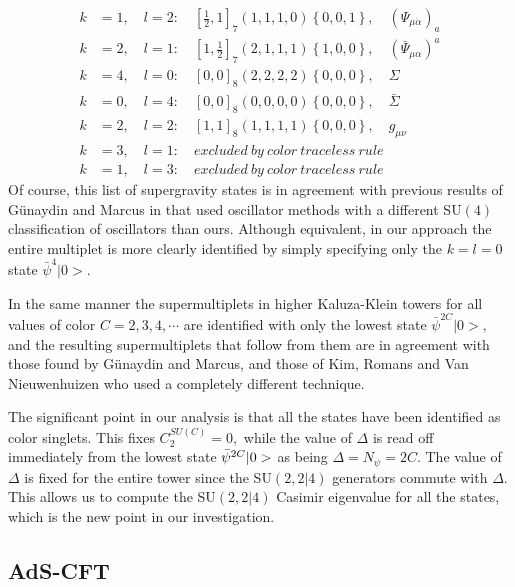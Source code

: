 \documentclass[a4paper,aps,preprint,nofootinbib]{revtex4}
\begin{document}
\begin{align}
k & =1,\quad l=2:\quad\left[ \frac{1}{2},1\right] _{7}\left( 1,1,1,0\right)
\left\{ 0,0,1\right\} ,\quad\left( \Psi_{\mu\dot{\alpha}}\right) _{a} \\
k & =2,\quad l=1:\quad\left[ 1,\frac{1}{2}\right] _{7}\left( 2,1,1,1\right)
\left\{ 1,0,0\right\} ,\quad\left( \bar{\Psi}_{\mu\alpha }\right) ^{a} \\
k & =4,\quad l=0:\quad\left[ 0,0\right] _{8}\left( 2,2,2,2\right) \left\{
0,0,0\right\} ,\quad\Sigma \\
k & =0,\quad l=4:\quad\left[ 0,0\right] _{8}\left( 0,0,0,0\right) \left\{
0,0,0\right\} ,\quad\bar{\Sigma} \\
k & =2,\quad l=2:\quad\left[ 1,1\right] _{8}\left( 1,1,1,1\right) \left\{
0,0,0\right\} ,\quad g_{\mu\nu} \\
k & =3,\quad l=1:\quad excluded~by~color~traceless~rule \\
k & =1,\quad l=3:\quad excluded~by~color~traceless~rule
\end{align}
Of course, this list of supergravity states is in agreement with previous
results of G\"{u}naydin and Marcus in \cite{barsgunaydin} that used
oscillator methods with a different SU$\left( 4\right) $ classification of
oscillators than ours. Although equivalent, in our approach the entire
multiplet is more clearly identified by simply specifying only the $k=l=0$
state $\bar{\psi}^{4}|0>$.

In the same manner the supermultiplets in higher Kaluza-Klein towers for all
values of color $C=2,3,4,\cdots$ are identified with only the lowest state $%
\bar{\psi}^{2C}|0>,$ and the resulting supermultiplets that follow from them
are in agreement with those found by G\"{u}naydin and Marcus, and those of
Kim, Romans and Van Nieuwenhuizen \cite{KRN} who used a completely different
technique.

The significant point in our analysis is that all the states have been
identified as color singlets. This fixes $C_{2}^{SU\left(C\right)}=0,$ while
the value of $\Delta$ is read off immediately from the lowest state $\bar{%
\psi}^{2C}|0>$ as being $\Delta=N_{\psi}=2C$. The value of $\Delta$ is fixed
for the entire tower since the SU$\left( 2,2|4\right)$ generators commute
with $\Delta$. This allows us to compute the SU$\left(2,2|4\right)$ Casimir
eigenvalue for all the states, which is the new point in our investigation.

\subsection{AdS-CFT}
\end{document}
